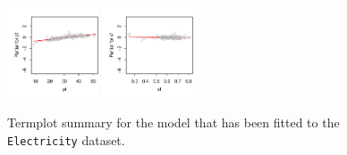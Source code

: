 \documentclass[12pt, a4paper,  BCOR=8.25mm, DIV=15]{scrartcl}\usepackage[]{graphicx}\usepackage[]{color}
\newenvironment{knitrout}{}{} %
\begin{document}
\begin{figure}[H]
\begin{knitrout}
{\includegraphics[width=0.24\textwidth]{figs/reg-elec-me-tplot-11_16-6} 
\includegraphics[width=0.24\textwidth]{figs/reg-elec-me-tplot-11_16-7} 

}



\end{knitrout}
\caption{Termplot summary for the model that has been fitted to the
  \texttt{Electricity} dataset.\label{fig:elec-log-tplot}}
\end{figure}
\end{document}
